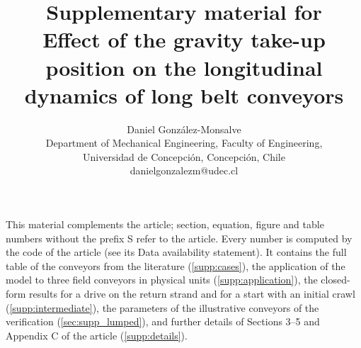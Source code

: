 \documentclass[a4paper,11pt]{article}
\title{Supplementary material for\\[2pt]
  \large Effect of the gravity take-up position on the longitudinal dynamics of long belt
  conveyors}
\author{Daniel González-Monsalve\\[2pt]
  \small Department of Mechanical Engineering, Faculty of Engineering,\\
  \small Universidad de Concepción, Concepción, Chile\\ \small danielgonzalezm@udec.cl}
\date{}
\begin{document}
\maketitle

\noindent This material complements the article; section, equation, figure and table numbers
without the prefix S refer to the article. Every number is computed by the code of the article
(see its Data availability statement). It contains the full table of the conveyors from the
literature (\ref{supp:cases}), the application of the model to three field conveyors in physical
units (\ref{supp:application}), the closed-form results for a drive on the return strand and
for a start with an initial crawl (\ref{supp:intermediate}), the parameters of the illustrative
conveyors of the verification (\ref{sec:supp_lumped}), and further details of Sections 3--5 and
Appendix C of the article (\ref{supp:details}).









\end{document}
